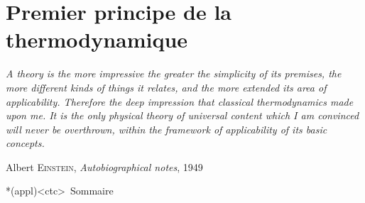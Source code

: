 \documentclass[../../main/main.tex]{subfiles}
\begin{document}
\setcounter{chapter}{2}


\chapter{Premier principe de la thermodynamique}

\epigraph{\openquote\textit{%
		A theory is the more impressive the greater the simplicity of its premises,
		the more different kinds of things it relates, and the more extended its
		area of applicability. Therefore the deep impression that classical
		thermodynamics made upon me. It is the only physical theory of universal
		content which I am convinced will never be overthrown, within the framework
		of applicability of its basic concepts.
	}\closequote}{Albert \textsc{Einstein}, \textit{Autobiographical notes}, 1949}

\vspace*{\fill}

\begin{tcn}*(appl)<ctc>{\iconsomm~Sommaire}
	\let\item\olditem
	\vspace{-15pt}
	\minitoc
	\vspace{-25pt}
\end{tcn}
\end{document}
